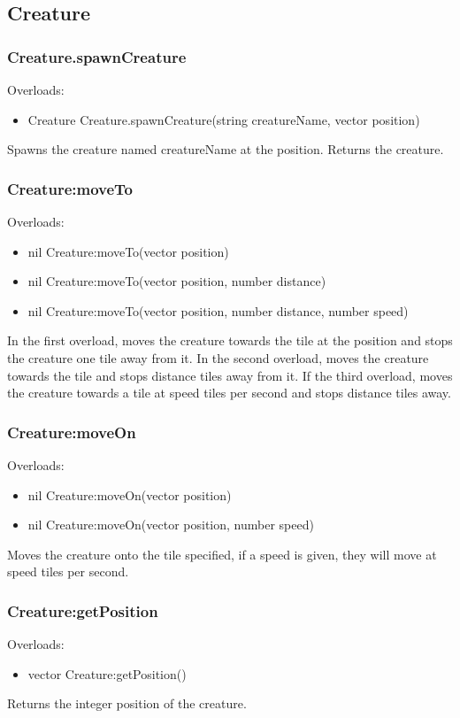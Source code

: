 \documentclass{book}
\newenvironment{ulist}
	{\begin{itemize}
			\itemsep0em}
	{\end{itemize}}
\begin{document}
\subsection{Creature}
\subsubsection{Creature.spawnCreature}
Overloads:
\begin{ulist}
	\item Creature Creature.spawnCreature(string creatureName, vector position)
\end{ulist}
Spawns the creature named creatureName at the position. Returns the creature.

\subsubsection{Creature:moveTo}
Overloads:
\begin{ulist}
	\item nil Creature:moveTo(vector position)
	\item nil Creature:moveTo(vector position, number distance)
	\item nil Creature:moveTo(vector position, number distance, number speed)
\end{ulist}
In the first overload, moves the creature towards the tile at the position and stops the creature one tile away from it. In the second overload, moves the creature towards the tile and stops distance tiles away from it. If the third overload, moves the creature towards a tile at speed tiles per second and stops distance tiles away.

\subsubsection{Creature:moveOn}
Overloads:
\begin{ulist}
	\item nil Creature:moveOn(vector position)
	\item nil Creature:moveOn(vector position, number speed)
\end{ulist}
Moves the creature onto the tile specified, if a speed is given, they will move at speed tiles per second.

\subsubsection{Creature:getPosition}
Overloads:
\begin{ulist}
	\item vector Creature:getPosition()
\end{ulist}
Returns the integer position of the creature.
\end{document}
